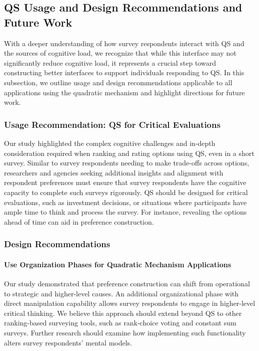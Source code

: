 \subsection{QS Usage and Design Recommendations and Future Work}
With a deeper understanding of how survey respondents interact with QS and the sources of cognitive load, we recognize that while this interface may not significantly reduce cognitive load, it represents a crucial step toward constructing better interfaces to support individuals responding to QS. In this subsection, we outline usage and design recommendations applicable to all applications using the quadratic mechanism and highlight directions for future work.

\subsubsection{Usage Recommendation: QS for Critical Evaluations}
Our study highlighted the complex cognitive challenges and in-depth consideration required when ranking and rating options using QS, even in a short survey. Similar to survey respondents needing to make trade-offs across options, researchers and agencies seeking additional insights and alignment with respondent preferences must ensure that survey respondents have the cognitive capacity to complete such surveys rigorously. QS should be designed for critical evaluations, such as investment decisions, or situations where participants have ample time to think and process the survey. For instance, revealing the options ahead of time can aid in preference construction.

\subsubsection{Design Recommendations}
\paragraph{Use Organization Phases for Quadratic Mechanism Applications}
Our study demonstrated that preference construction can shift from operational to strategic and higher-level causes. An additional organizational phase with direct manipulation capability allows survey respondents to engage in higher-level critical thinking. We believe this approach should extend beyond QS to other ranking-based surveying tools, such as rank-choice voting and constant sum surveys. Further research should examine how implementing such functionality alters survey respondents' mental models.

